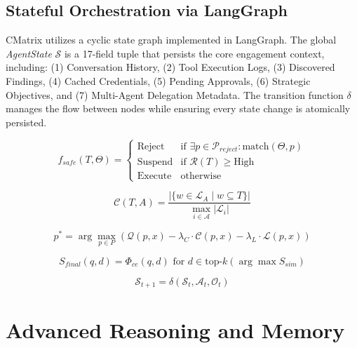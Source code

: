 \documentclass[conference]{IEEEtran}
\begin{document}
\subsection{Stateful Orchestration via LangGraph}
CMatrix utilizes a cyclic state graph implemented in LangGraph. The global \textit{AgentState} $\mathcal{S}$ is a 17-field tuple that persists the core engagement context, including: (1) Conversation History, (2) Tool Execution Logs, (3) Discovered Findings, (4) Cached Credentials, (5) Pending Approvals, (6) Strategic Objectives, and (7) Multi-Agent Delegation Metadata. The transition function $\delta$ manages the flow between nodes while ensuring every state change is atomically persisted.

\begin{equation} \label{eq:safety_gate}
f_{safe}(T, \Theta) = 
\begin{cases} 
\text{Reject} & \text{if } \exists p \in \mathcal{P}_{reject} : \text{match}(\Theta, p) \\
\text{Suspend} & \text{if } \mathcal{R}(T) \geq \text{High} \\
\text{Execute} & \text{otherwise}
\end{cases}
\end{equation}

\begin{equation} \label{eq:routing_confidence}
\mathcal{C}(T, A) = \frac{|\{ w \in \mathcal{L}_A \mid w \subseteq T \}|}{\max_{i \in \mathcal{A}} |\mathcal{L}_i|}
\end{equation}

\begin{equation} \label{eq:routing_opt}
p^* = \arg \max_{p \in P} \left( \mathcal{Q}(p, x) - \lambda_C \cdot \mathcal{C}(p, x) - \lambda_L \cdot \mathcal{L}(p, x) \right)
\end{equation}

\begin{equation} \label{eq:rag_final}
S_{final}(q, d) = \Phi_{ce}(q, d) \text{ for } d \in \text{top-}k(\arg \max S_{sim})
\end{equation}

\begin{equation} \label{eq:state_transition}
\mathcal{S}_{t+1} = \delta(\mathcal{S}_t, \mathcal{A}_t, \mathcal{O}_t)
\end{equation}

\section{Advanced Reasoning and Memory}
\label{sec:reasoning}
\end{document}
